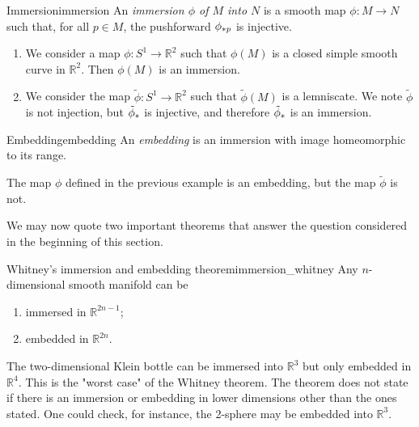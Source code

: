 \begin{definition}{Immersion}{immersion}
    An \emph{immersion \(\phi\) of \(M\) into \(N\)} is a smooth map \(\phi : M \to N\) such that, for all \(p \in M\), the pushforward \(\pf[p]\phi\) is injective.
\end{definition}
\begin{example}
    \begin{enumerate}[label=(\alph*)]
        \item We consider a map \(\phi : S^1 \to \mathbb{R}^2\) such that \(\phi(M)\) is a closed simple smooth curve in \(\mathbb{R}^2\). Then \(\phi(M)\) is an immersion.
        \item We consider the map \(\tilde\phi : S^1 \to \mathbb{R}^2\) such that \(\tilde\phi(M)\) is a lemniscate. We note \(\tilde\phi\) is not injection, but \(\pf{\tilde\phi}\) is injective, and therefore \(\pf{\tilde\phi}\) is an immersion.
    \end{enumerate}
\end{example}

\begin{definition}{Embedding}{embedding}
    An \emph{embedding} is an immersion with image homeomorphic to its range.
\end{definition}
\begin{example}
    The map \(\phi\) defined in the previous example is an embedding, but the map \(\tilde\phi\) is not.
\end{example}

We may now quote two important theorems that answer the question considered in the beginning of this section.

\begin{theorem}{Whitney's immersion and embedding theorem}{immersion_whitney}
    Any \(n\)-dimensional smooth manifold can be
    \begin{enumerate}[label=(\alph*)]
        \item immersed in \(\mathbb{R}^{2n-1}\);
        \item embedded in \(\mathbb{R}^{2n}\).
    \end{enumerate}
\end{theorem}
\begin{example}
    The two-dimensional Klein bottle can be immersed into \(\mathbb{R}^3\) but only embedded in \(\mathbb{R}^4\). This is the "worst case" of the Whitney theorem. The theorem does not state if there is an immersion or embedding in lower dimensions other than the ones stated. One could check, for instance, the 2-sphere may be embedded into \(\mathbb{R}^3\).
\end{example}

